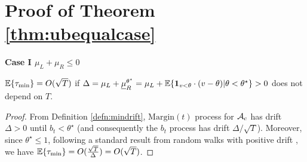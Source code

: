 \section{Proof of Theorem \ref{thm:ubequalcase}}\label{app:thm:ubequalcase}
{\bf Case I $\mu_L + \mu_R\le 0$}
\begin{prop}\label{prop:crossingtime}
${\mathbb{E}}\{\tau_{\min}\}=O(\sqrt{T})$ if
$\Delta = \mu_L+ \underline {\mu}_R^{\theta^\star} = \mu_L+ \bbE\{\b1_{v< \theta}\cdot (v-\theta) | \theta<\theta^\star\}>0$ does not depend on $T$.
\end{prop}
\begin{proof}
From Definition \ref{defn:mindrift}, $\text{Margin}(t)$ process  for $\mathcal{A}_c$ has  drift $\Delta >0$ until $b_t<\theta^\star$ (and consequently the $b_t$ process has drift $\Delta/\sqrt{T}$). Moreover, since $\theta^\star\le 1$, following a standard 
result from random walks with positive drift \cite{feller1991introduction}, we have ${\mathbb{E}}\{\tau_{\min}\}=O(\frac{\sqrt{T}}{\Delta}) = O(\sqrt{T})$.
\end{proof}


